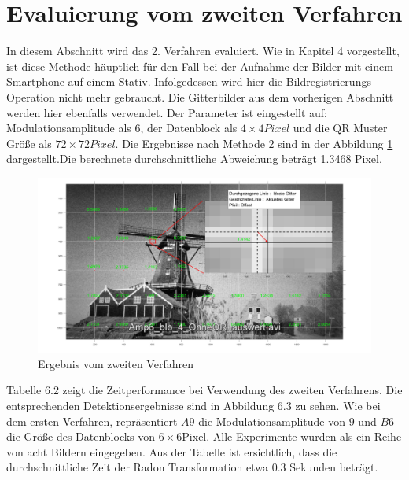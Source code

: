 \section{Evaluierung vom zweiten Verfahren}

In diesem Abschnitt wird das 2. Verfahren evaluiert. Wie in Kapitel 4 vorgestellt, ist diese Methode häuptlich für den Fall bei der Aufnahme der Bilder mit einem Smartphone auf einem Stativ. Infolgedessen wird hier die Bildregistrierungs Operation nicht mehr gebraucht. Die Gitterbilder aus dem vorherigen Abschnitt werden hier ebenfalls verwendet. Der Parameter ist eingestellt auf: Modulationsamplitude als 6, der Datenblock als $ 4 \times 4 Pixel$ und die QR Muster Größe als $ 72 \times 72 Pixel $. Die Ergebnisse nach Methode 2 sind in der Abbildung \ref{fig:Ergebnis2} dargestellt.Die berechnete durchschnittliche Abweichung beträgt 1.3468 Pixel. 
\begin{figure}[H]
 \centering 
  \includegraphics[keepaspectratio,width=1.00\textwidth]{images/6_Auswertung/Ergebnis2.pdf}
 \caption{Ergebnis vom zweiten Verfahren}
 \label{fig:Ergebnis2}
\end{figure}

Tabelle 6.2 zeigt die Zeitperformance bei Verwendung des zweiten Verfahrens. Die entsprechenden Detektionsergebnisse sind in Abbildung 6.3 zu sehen. Wie bei dem ersten Verfahren, repräsentiert $ A9 $
die Modulationsamplitude von $ 9 $ und $ B6 $ die Größe des Datenblocks von $ 6 \times 6 $Pixel. Alle Experimente wurden als ein Reihe von acht Bildern eingegeben. Aus der Tabelle ist ersichtlich, dass die durchschnittliche Zeit der Radon Transformation etwa 0.3 Sekunden beträgt.

